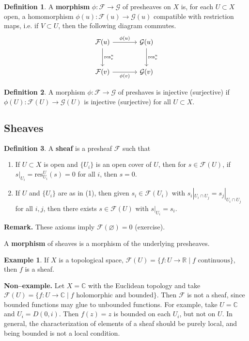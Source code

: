 \documentclass{article}
\theoremstyle{definition}
\newtheorem{example}{Example}[section]
\newtheorem{defn}{Definition}[section]
\begin{document}
\begin{defn}
    A \textbf{morphism} $\phi : \mathcal{F} \to \mathcal{G}$ of presheaves on $X$ is, for each $U \subset X$ open, a homomorphism $\phi(u) : \mathcal{F}(u) \to \mathcal{G}(u)$ compatible with restriction maps, i.e. if $V \subset U$, then the following diagram commutes. 
    \[\begin{tikzcd}[row sep=large,column sep=large]
        \mathcal{F}(u) & \mathcal{G}(u) \\
        \mathcal{F}(v) & \mathcal{G}(v)
        \arrow["\phi(u)", from=1-1, to=1-2]
        \arrow["\text{res}^u_v",from=1-1, to=2-1]
        \arrow["\text{res}^u_v", from=1-2, to=2-2]
        \arrow["\phi(v)"', from=2-1, to=2-2]
    \end{tikzcd}\]
\end{defn}
\begin{defn}
    A morphism $\phi : \mathcal{F} \to \mathcal{G}$ of preshaves is injective (surjective) if $\phi(U) : \mathcal{F}(U) \to \mathcal{G}(U)$ is injective (surjective) for all $U \subset X$.
\end{defn}

\subsection{Sheaves}


\begin{defn}
    A \textbf{sheaf} is a presheaf $\mathcal{F}$ such that 
    \begin{enumerate}[(1)]
        \item If $U \subset X$ is open and $\{U_i\}$ is an open cover of $U$, then for $s \in \mathcal{F}(U)$, if $s|_{U_i} = \text{res}^U_{U_i}(s) = 0$ for all $i$, then $s = 0$.
        \item If $U$ and $\{U_i\}$ are as in (1), then given $s_i \in \mathcal{F}(U_i)$ with $s_i |_{U_i \cap U_j} = s_j |_{U_i \cap U_j}$ for all $i,j$, then there exists $s \in \mathcal{F}(U)$ with $s |_{U_i} = s_i$.
    \end{enumerate}
\end{defn}
\textbf{Remark.} These axioms imply $\mathcal{F}(\varnothing) = 0$ (exercise).
\vspace{1mm}
 
A \textbf{morphism} of sheaves is a morphism of the underlying presheaves.

\begin{example}
    If $X$ is a topological space, $\mathcal{F}(U) = \{f : U \to \mathbb{R} \mid f \text{ continuous}\}$, then $f$ is a sheaf.
\end{example}
\textbf{Non--example.} Let $X = \mathbb{C}$ with the Euclidean topology and take $\mathcal{F}(U) = \{f: U \to \mathbb{C} \mid f \text{ holomorphic and bounded}\}$. Then $\mathcal{F}$ is not a sheaf, since bounded functions may glue to unbounded functions. For example, take $U = \mathbb{C}$ and $U_i = D(0,i)$. Then $f(z) = z$ is bounded on each $U_i$, but not on $U$. In general, the characterization of elements of a sheaf should be purely local, and being bounded is not a local condition.
\vspace{1mm}
 
\end{document}
